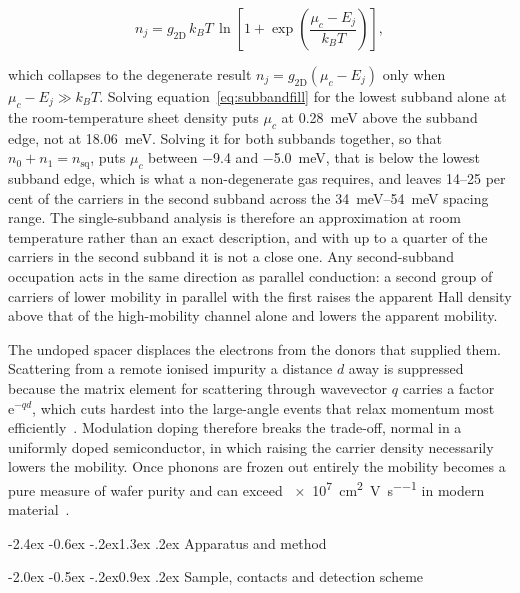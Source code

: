 \documentclass[11pt,a4paper]{article}
\makeatletter
\renewcommand\section{\@startsection{section}{1}{\z@}%
  {-2.4ex \@plus -0.6ex \@minus -.2ex}{1.3ex \@plus .2ex}%
  {\normalfont\large\bfseries}}
\renewcommand\subsection{\@startsection{subsection}{2}{\z@}%
  {-2.0ex \@plus -0.5ex \@minus -.2ex}{0.9ex \@plus .2ex}%
  {\normalfont\normalsize\bfseries}}
\newcommand{\nsq}{n_{\mathrm{sq}}}
\makeatother
\begin{document}
\begin{equation}
n_j = g_{\mathrm{2D}}\,k_BT\,
\ln\!\left[1+\exp\!\left(\frac{\mu_c - E_j}{k_BT}\right)\right],
\label{eq:subbandfill}
\end{equation}

which collapses to the degenerate result $n_j = g_{\mathrm{2D}}(\mu_c - E_j)$ only when
$\mu_c - E_j \gg k_BT$. Solving equation~\eqref{eq:subbandfill} for the lowest subband alone at
the room-temperature sheet density puts $\mu_c$ at \qty{+0.28}{\milli\electronvolt} above the
subband edge, not at \qty{18.06}{\milli\electronvolt}. Solving it for both subbands together,
so that $n_0 + n_1 = \nsq$, puts $\mu_c$ between \num{-9.4} and
\qty{-5.0}{\milli\electronvolt}, that is below the lowest subband edge, which is what a
non-degenerate gas requires, and leaves \numrange{14}{25} per cent of the carriers in the
second subband across the \qtyrange{34}{54}{\milli\electronvolt} spacing range. The
single-subband analysis is therefore an approximation at room
temperature rather than an exact description, and with up to a quarter of the carriers in the
second subband it is not a close one. Any second-subband occupation acts in the same
direction as parallel conduction: a second group of carriers of lower mobility in parallel
with the first raises the apparent Hall density above that of the high-mobility channel alone
and lowers the apparent mobility.

The undoped spacer displaces the electrons from the donors that supplied them. Scattering
from a remote ionised impurity a distance $d$ away is suppressed because the matrix element
for scattering through wavevector $q$ carries a factor $\mathrm{e}^{-qd}$, which cuts
hardest into the large-angle events that relax momentum most
efficiently~\cite{walukiewicz1984}. Modulation doping therefore breaks the trade-off, normal
in a uniformly doped semiconductor, in which raising the carrier density necessarily lowers
the mobility. Once phonons are frozen out entirely the mobility becomes a pure measure of
wafer purity and can exceed \qty{e7}{\centi\metre\squared\per\volt\per\second} in modern
material~\cite{hwang2008}.

\section{Apparatus and method}

\subsection{Sample, contacts and detection scheme}
\end{document}
